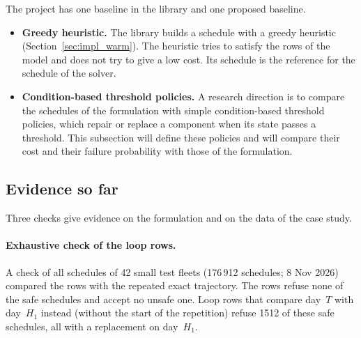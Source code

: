 \documentclass[11pt,a4paper]{article}
\theoremstyle{plain}
\theoremstyle{definition}
\theoremstyle{remark}
\begin{document}
The project has one baseline in the library and one proposed baseline.
\begin{itemize}
  \item \textbf{Greedy heuristic.} The library builds a schedule with a greedy heuristic (Section~\ref{sec:impl_warm}).
    The heuristic tries to satisfy the rows of the model and does not try to give a low cost.
    Its schedule is the reference for the schedule of the solver.
  \item \textbf{Condition-based threshold policies.} A research direction is to compare the schedules of the formulation with simple condition-based threshold policies, which repair or replace a component when its state passes a threshold.
    This subsection will define these policies and will compare their cost and their failure probability with those of the formulation.
\end{itemize}

\subsection{Evidence so far}

Three checks give evidence on the formulation and on the data of the case study.

\paragraph{Exhaustive check of the loop rows.}
A check of all schedules of 42 small test fleets (176\,912 schedules; 8 Nov 2026) compared the rows with the repeated exact trajectory.
The rows refuse none of the safe schedules and accept no unsafe one.
Loop rows that compare day~$T$ with day~$H_1$ instead (without the start of the repetition) refuse 1512 of these safe schedules, all with a replacement on day~$H_1$.
\end{document}
